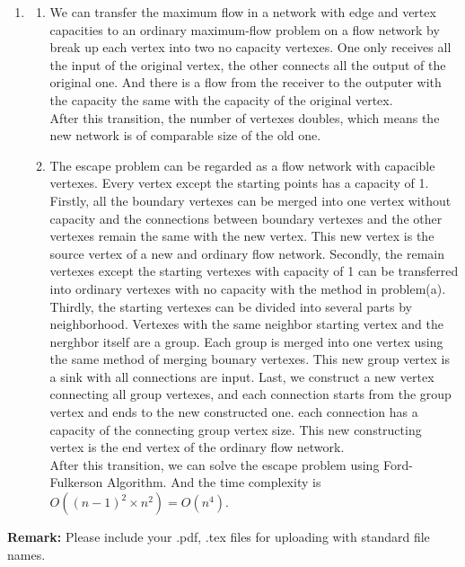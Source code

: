 \documentclass[12pt,a4paper]{article}
\makeatletter
\newtheorem*{solution}{Solution}
\theoremstyle{definition}
\renewenvironment{solution}[1][Solution] {\par\pushQED{\qed}\normalfont\topsep6\p@\@plus6\p@\relax\trivlist\item[\hskip\labelsep\bfseries#1\@addpunct{.}]\ignorespaces}{\popQED\endtrivlist\@endpefalse} \makeatother
\makeatother
\begin{document}
\begin{enumerate}
	\begin{solution}
		\begin{enumerate}
			\item We can transfer the maximum flow in a network with edge and vertex capacities to an ordinary maximum-flow problem on a flow network by break up each vertex into two no capacity vertexes. One only receives all the input of the original vertex, the other connects all the output of the original one. And there is a flow from the receiver to the outputer with the capacity the same with the capacity of the original vertex.\\
			After this transition, the number of vertexes doubles, which means the new network is of comparable size of the old one.
			\item The escape problem can be regarded as a flow network with capacible vertexes. Every vertex except the starting points has a capacity of 1. Firstly, all the boundary vertexes can be merged into one vertex without capacity and the connections between boundary vertexes and the other vertexes remain the same with the new vertex. This new vertex is the source vertex of a new and ordinary flow network. Secondly, the remain vertexes except the starting vertexes with capacity of 1 can be transferred into ordinary vertexes with no capacity with the method in problem(a). Thirdly, the starting vertexes can be divided into several parts by neighborhood. Vertexes with the same neighbor starting vertex and the nerghbor itself are a group. Each group is merged into one vertex using the same method of merging bounary vertexes. This new group vertex is a sink with all connections are input. Last, we construct a new vertex connecting all group vertexes, and each connection starts from the group vertex and ends to the new constructed one. each connection has a capacity of the connecting group vertex size. This new constructing vertex is the end vertex of the ordinary flow network. \\
			After this transition, we can solve the escape problem using Ford-Fulkerson Algorithm. And the time complexity is $O((n-1)^2\times n^2)=O(n^4)$.
		\end{enumerate}
	\end{solution}
    
    
\end{enumerate}

\textbf{Remark:} Please include your .pdf, .tex files for uploading with standard file names.
\newpage


\end{document}
